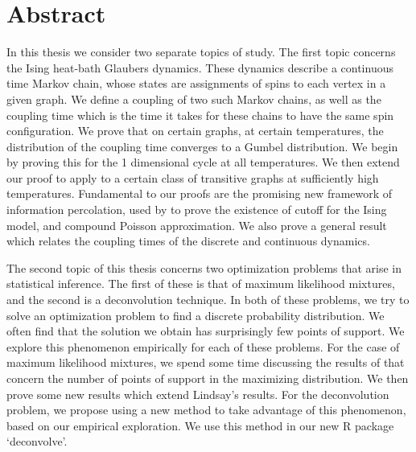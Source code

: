 \documentclass[11pt, oneside]{Thesis} %
\begin{document}
\chapter*{Abstract}

In this thesis we consider two separate topics of study. The first topic concerns the Ising heat-bath Glaubers dynamics. These dynamics describe a continuous time Markov chain, whose states are assignments of spins to each vertex in a given graph. We define a coupling of two such Markov chains, as well as the coupling time which is the time it takes for these chains to have the same spin configuration. We prove that on certain graphs, at certain temperatures, the distribution of the coupling time converges to a Gumbel distribution. We begin by proving this for the 1 dimensional cycle at all temperatures. We then extend our proof to apply to a certain class of transitive graphs at sufficiently high temperatures. Fundamental to our proofs are the promising new framework of information percolation, used by \citeauthor{Lubetzky2016-wd} to prove the existence of cutoff for the Ising model, and compound Poisson approximation. We also prove a general result which relates the coupling times of the discrete and continuous dynamics.

The second topic of this thesis concerns two optimization problems that arise in statistical inference. The first of these is that of maximum likelihood mixtures, and the second is a deconvolution technique. In both of these problems, we try to solve an optimization problem to find a discrete probability distribution. We often find that the solution we obtain has surprisingly few points of support. We explore this phenomenon empirically for each of these problems. For the case of maximum likelihood mixtures, we spend some time discussing the results of \citeauthor{Lindsay1983-tf} that concern the number of points of support in the maximizing distribution. We then prove some new results which extend Lindsay's results. For the deconvolution problem, we propose using a new method to take advantage of this phenomenon, based on our empirical exploration. We use this method in our new R package `deconvolve'.


\clearpage 

\end{document}
